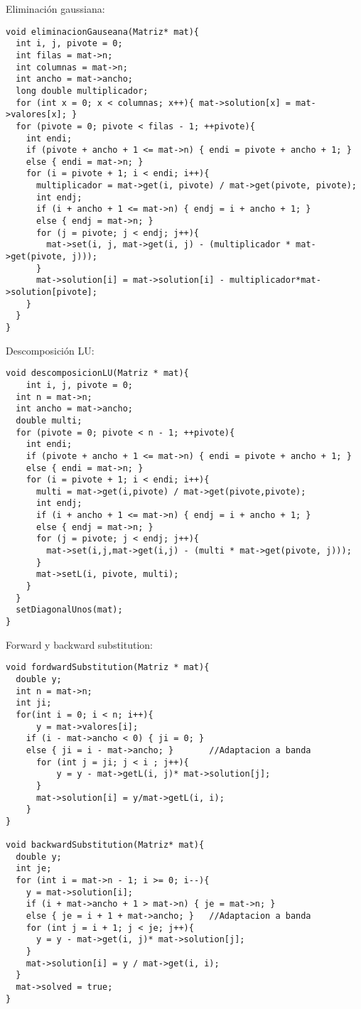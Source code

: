 \documentclass[a4paper]{article}
\begin{document}
Eliminación gaussiana:
\begin{lstlisting}
void eliminacionGauseana(Matriz* mat){
  int i, j, pivote = 0;
  int filas = mat->n;
  int columnas = mat->n;
  int ancho = mat->ancho;
  long double multiplicador;
  for (int x = 0; x < columnas; x++){ mat->solution[x] = mat->valores[x]; }
  for (pivote = 0; pivote < filas - 1; ++pivote){
    int endi;
    if (pivote + ancho + 1 <= mat->n) { endi = pivote + ancho + 1; }
    else { endi = mat->n; }
    for (i = pivote + 1; i < endi; i++){
      multiplicador = mat->get(i, pivote) / mat->get(pivote, pivote);
      int endj;
      if (i + ancho + 1 <= mat->n) { endj = i + ancho + 1; }
      else { endj = mat->n; }
      for (j = pivote; j < endj; j++){
        mat->set(i, j, mat->get(i, j) - (multiplicador * mat->get(pivote, j)));
      }
      mat->solution[i] = mat->solution[i] - multiplicador*mat->solution[pivote];
    }
  }
}

\end{lstlisting}
Descomposición LU:
\begin{lstlisting}
void descomposicionLU(Matriz * mat){
    int i, j, pivote = 0;
  int n = mat->n;
  int ancho = mat->ancho;
  double multi;
  for (pivote = 0; pivote < n - 1; ++pivote){
    int endi;
    if (pivote + ancho + 1 <= mat->n) { endi = pivote + ancho + 1; }
    else { endi = mat->n; }
    for (i = pivote + 1; i < endi; i++){  
      multi = mat->get(i,pivote) / mat->get(pivote,pivote);
      int endj;
      if (i + ancho + 1 <= mat->n) { endj = i + ancho + 1; }
      else { endj = mat->n; }
      for (j = pivote; j < endj; j++){
        mat->set(i,j,mat->get(i,j) - (multi * mat->get(pivote, j)));
      }
      mat->setL(i, pivote, multi);
    }
  }
  setDiagonalUnos(mat);
}
\end{lstlisting}
Forward y backward substitution:
\begin{lstlisting}
void fordwardSubstitution(Matriz * mat){
  double y;
  int n = mat->n;
  int ji;
  for(int i = 0; i < n; i++){
      y = mat->valores[i];
    if (i - mat->ancho < 0) { ji = 0; }
    else { ji = i - mat->ancho; }       //Adaptacion a banda
      for (int j = ji; j < i ; j++){
          y = y - mat->getL(i, j)* mat->solution[j];
      }
      mat->solution[i] = y/mat->getL(i, i);
    }
}

void backwardSubstitution(Matriz* mat){
  double y;
  int je;
  for (int i = mat->n - 1; i >= 0; i--){
    y = mat->solution[i];
    if (i + mat->ancho + 1 > mat->n) { je = mat->n; }
    else { je = i + 1 + mat->ancho; }   //Adaptacion a banda
    for (int j = i + 1; j < je; j++){
      y = y - mat->get(i, j)* mat->solution[j];
    }
    mat->solution[i] = y / mat->get(i, i);
  }
  mat->solved = true;
}
\end{lstlisting}
\end{document}
